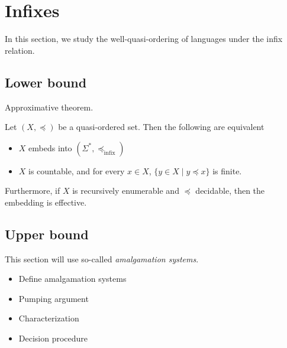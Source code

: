 
\section{Infixes}
\label{infixes:sec}


In this section, we study the well-quasi-ordering of languages under the infix
relation.

\subsection{Lower bound}

Approximative theorem.
\begin{theorem}
    Let $(X, \preceq)$ be a quasi-ordered set.
    Then the following are equivalent
    \begin{itemize}
        \item $X$ embeds into $(\Sigma^*, \preceq_{\text{infix}})$
        \item $X$ is countable, and for every $x \in X$,
            $\{y \in X \mid y \preceq x\}$ is finite.
    \end{itemize}

    Furthermore, if $X$ is recursively enumerable and $\preceq$ decidable,
    then
    the embedding is effective.
\end{theorem}


\subsection{Upper bound}

This section will use so-called \emph{amalgamation systems}.

\begin{itemize}
    \item Define amalgamation systems
    \item Pumping argument
    \item Characterization
    \item Decision procedure
\end{itemize}
